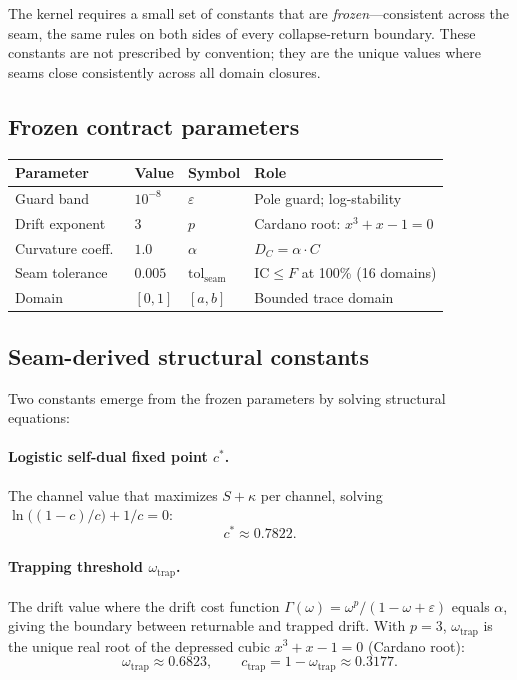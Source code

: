 \documentclass[
  aps,
  prd,
  preprint,
  superscriptaddress,
  nofootinbib,
  floatfix
]{revtex4-2}
\newcommand{\tolseam}{\mathrm{tol}_{\mathrm{seam}}}
\newcommand{\IC}{\mathrm{IC}}
\begin{document}
The kernel requires a small set of constants that are \emph{frozen}---consistent across the seam, the same rules on both
sides of every collapse-return boundary. These constants are not prescribed by convention; they are the unique values
where seams close consistently across all domain closures.

\subsection{Frozen contract parameters}
\begin{center}
\small
\begin{tabular}{@{}llll@{}}
\toprule
Parameter & Value & Symbol & Role \\
\midrule
Guard band & $10^{-8}$ & $\varepsilon$ & Pole guard; log-stability \\
Drift exponent & $3$ & $p$ & Cardano root: $x^3{+}x{-}1{=}0$ \\
Curvature coeff.\ & $1.0$ & $\alpha$ & $D_C = \alpha\cdot C$ \\
Seam tolerance & $0.005$ & $\tolseam$ & $\IC{\le}F$ at 100\% (16 domains) \\
Domain & $[0,1]$ & $[a,b]$ & Bounded trace domain \\
\bottomrule
\end{tabular}
\end{center}

\subsection{Seam-derived structural constants}
Two constants emerge from the frozen parameters by solving structural equations:

\paragraph{Logistic self-dual fixed point $c^*$.}
The channel value that maximizes $S+\kappa$ per channel, solving $\ln\!\bigl((1-c)/c\bigr)+1/c=0$:
\begin{equation}
  c^* \approx 0.7822.
\end{equation}

\paragraph{Trapping threshold $\omega_{\mathrm{trap}}$.}
The drift value where the drift cost function $\Gamma(\omega)=\omega^p/(1-\omega+\varepsilon)$ equals $\alpha$, giving the boundary
between returnable and trapped drift. With $p=3$, $\omega_{\mathrm{trap}}$ is the unique real root of the depressed cubic
$x^3+x-1=0$ (Cardano root):
\begin{equation}
  \omega_{\mathrm{trap}} \approx 0.6823, \qquad c_{\mathrm{trap}} = 1-\omega_{\mathrm{trap}} \approx 0.3177.
\end{equation}
\end{document}
